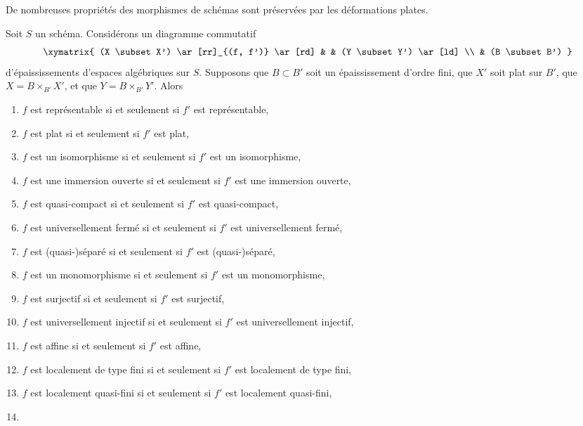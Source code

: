 \noindent
De nombreuses propriétés des morphismes de schémas sont préservées par les
déformations plates.

\begin{lemma}
\label{lemma-deform-property}
Soit $S$ un schéma. Considérons un diagramme commutatif
$$
\xymatrix{
(X \subset X') \ar[rr]_{(f, f')} \ar[rd] & & (Y \subset Y') \ar[ld] \\
& (B \subset B')
}
$$
d'épaississements d'espaces algébriques sur $S$. Supposons que $B \subset B'$
soit un épaississement d'ordre fini, que $X'$ soit plat sur $B'$, que $X = B \times_{B'} X'$,
et que $Y = B \times_{B'} Y'$. Alors
\begin{enumerate}
\item $f$ est représentable si et seulement si $f'$ est représentable,
\label{item-representable}
\item $f$ est plat si et seulement si $f'$ est plat,
\label{item-flat}
\item $f$ est un isomorphisme si et seulement si $f'$ est un isomorphisme,
\label{item-isomorphism}
\item $f$ est une immersion ouverte si et seulement si $f'$ est une immersion ouverte,
\label{item-open-immersion}
\item $f$ est quasi-compact si et seulement si $f'$ est quasi-compact,
\label{item-quasi-compact}
\item $f$ est universellement fermé si et seulement si $f'$ est universellement fermé,
\label{item-universally-closed}
\item $f$ est (quasi-)séparé si et seulement si $f'$ est (quasi-)séparé,
\label{item-separated}
\item $f$ est un monomorphisme si et seulement si $f'$ est un monomorphisme,
\label{item-monomorphism}
\item $f$ est surjectif si et seulement si $f'$ est surjectif,
\label{item-surjective}
\item $f$ est universellement injectif si et seulement si $f'$ est universellement injectif,
\label{item-universally-injective}
\item $f$ est affine si et seulement si $f'$ est affine,
\label{item-affine}
\item
\label{item-finite-type}
$f$ est localement de type fini si et seulement si $f'$ est localement de type fini,
\item $f$ est localement quasi-fini si et seulement si $f'$ est localement quasi-fini,
\label{item-quasi-finite}
\item
\label{item-finite-presentation}

\end{enumerate}
\end{lemma}
